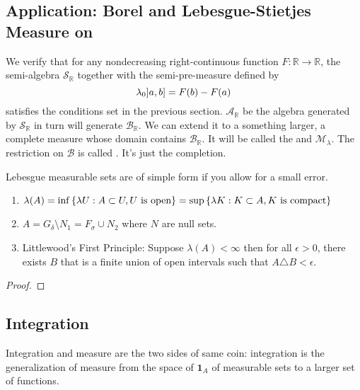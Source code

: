 \subsection{Application: Borel and Lebesgue-Stietjes Measure on }

We verify that for any nondecreasing right-continuous function \(F: \mathbb{R}\to \mathbb{R}\), the semi-algebra \(\mathcal{S}_{\mathbb{R}}\) together with the semi-pre-measure defined by 
\begin{equation*}
    \lambda_{0} \linterval{a}{b} = F(b) - F(a)
\end{equation*}
satisfies the conditions set in the previous section. \(\mathcal{A}_{\mathbb{R}}\) be the algebra generated by \(\mathcal{S}_{\mathbb{R}}\) in turn will generate \(\mathcal{B}_{\mathbb{R}}\). We can extend it to a something larger, a complete measure whose domain contains \(\mathcal{B}_{\mathbb{R}}\). It will be called the  and  \(\mathcal{M}_{\lambda}\). The restriction on \(\mathcal{B}\) is called . It's just the completion.  

\begin{thm}
    Lebesgue measurable sets are of simple form if you allow for a small error.

    \begin{enumerate}
        \item \(\lambda(A) = \inf\Bqty{\lambda U:  A \subset U, U  \text{ is open}} = \sup\Bqty{\lambda K : K \subset A, K \text{ is compact}}\)
        \item \(A = G_{\delta} \setminus N_{1}= F_{\sigma} \cup N_{2}\) where \(N\) are null sets.  
        \item Littlewood's First Principle: Suppose \(\lambda(A) < \infty\) then for all \(\epsilon > 0\), there exists \(B\) that is a finite union of open intervals such that \(A \triangle B < \epsilon\). 
    \end{enumerate}
\end{thm}
\begin{proof}
    
\end{proof}


\subsection{Integration}

Integration and measure are the two sides of same coin: integration is the generalization of measure from the space of  \(\mathbf{1}_{A}\) of measurable sets to a larger set of functions. 

